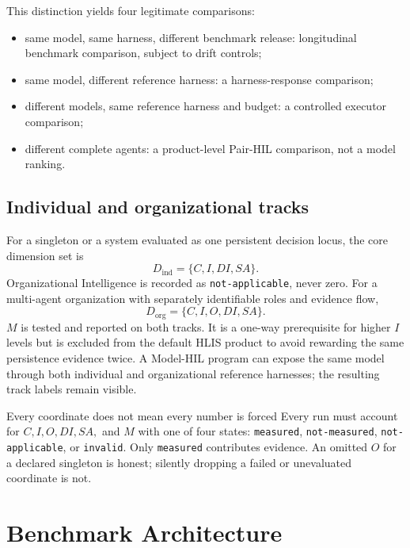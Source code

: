 \documentclass[11pt]{article}
\theoremstyle{definition}
\begin{document}
This distinction yields four legitimate comparisons:

\begin{itemize}
\item same model, same harness, different benchmark release: longitudinal benchmark comparison, subject to drift controls;
\item same model, different reference harness: a harness-response comparison;
\item different models, same reference harness and budget: a controlled executor comparison;
\item different complete agents: a product-level Pair-HIL comparison, not a model ranking.
\end{itemize}

\subsection{Individual and organizational tracks}

For a singleton or a system evaluated as one persistent decision locus, the core dimension set is
\begin{equation}
D_{\mathrm{ind}}=\{C,I,DI,SA\}.
\end{equation}
Organizational Intelligence is recorded as \texttt{not-applicable}, never zero. For a multi-agent organization with separately identifiable roles and evidence flow,
\begin{equation}
D_{\mathrm{org}}=\{C,I,O,DI,SA\}.
\end{equation}
$M$ is tested and reported on both tracks. It is a one-way prerequisite for higher $I$ levels but is excluded from the default HLIS product to avoid rewarding the same persistence evidence twice. A Model-HIL program can expose the same model through both individual and organizational reference harnesses; the resulting track labels remain visible.

\begin{claimbox}{Every coordinate does not mean every number is forced}
Every run must account for $C,I,O,DI,SA,$ and $M$ with one of four states: \texttt{measured}, \texttt{not-measured}, \texttt{not-applicable}, or \texttt{invalid}. Only \texttt{measured} contributes evidence. An omitted $O$ for a declared singleton is honest; silently dropping a failed or unevaluated coordinate is not.
\end{claimbox}

\section{Benchmark Architecture}\label{sec:architecture}
\end{document}
